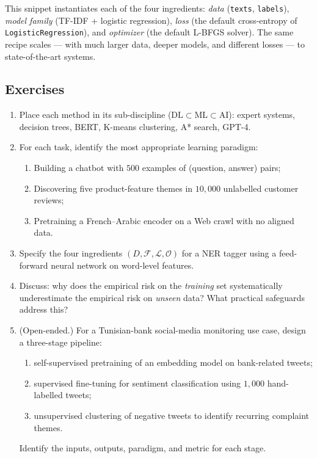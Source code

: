 \documentclass[12pt,a4paper]{report}
\theoremstyle{definition}
\theoremstyle{remark}
\begin{document}
This snippet instantiates each of the four ingredients: \emph{data} (\texttt{texts}, \texttt{labels}), \emph{model family} (TF-IDF + logistic regression), \emph{loss} (the default cross-entropy of \texttt{LogisticRegression}), and \emph{optimizer} (the default L-BFGS solver). The same recipe scales --- with much larger data, deeper models, and different losses --- to state-of-the-art systems.

\subsection{Exercises}
\begin{enumerate}
    \item Place each method in its sub-discipline ($\mathrm{DL} \subset \mathrm{ML} \subset \mathrm{AI}$): expert systems, decision trees, BERT, K-means clustering, A* search, GPT-4.
    \item For each task, identify the most appropriate learning paradigm:
    \begin{enumerate}
        \item Building a chatbot with $500$ examples of (question, answer) pairs;
        \item Discovering five product-feature themes in $10{,}000$ unlabelled customer reviews;
        \item Pretraining a French--Arabic encoder on a Web crawl with no aligned data.
    \end{enumerate}
    \item Specify the four ingredients $(D, \mathcal{F}, \mathcal{L}, \mathcal{O})$ for a NER tagger using a feed-forward neural network on word-level features.
    \item Discuss: why does the empirical risk on the \emph{training} set systematically underestimate the empirical risk on \emph{unseen} data? What practical safeguards address this?
    \item (Open-ended.) For a Tunisian-bank social-media monitoring use case, design a three-stage pipeline:
    \begin{enumerate}
        \item self-supervised pretraining of an embedding model on bank-related tweets;
        \item supervised fine-tuning for sentiment classification using $1{,}000$ hand-labelled tweets;
        \item unsupervised clustering of negative tweets to identify recurring complaint themes.
    \end{enumerate}
    Identify the inputs, outputs, paradigm, and metric for each stage.
\end{enumerate}
\end{document}
